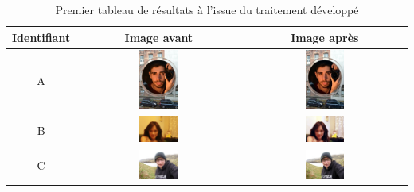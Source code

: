 \documentclass[11pt, french,screen]{report-rd-info}
\begin{document}
\begin{table}
\centering
\begin{tabular}{|c|c|c|}	
   \hline \textbf{Identifiant}  &  \textbf{Image avant}  &  \textbf{Image après}  \\ \hline 
   A & \includegraphics[width=0.25\textwidth]{Resultats/pa_avant} & \includegraphics[width=0.25\textwidth]{Resultats/pa_apres} \\ \hline
   B & \includegraphics[width=0.25\textwidth]{Resultats/pb_avant} & \includegraphics[width=0.25\textwidth]{Resultats/pb_apres} \\ \hline
   C & \includegraphics[width=0.25\textwidth]{Resultats/pc_avant} & \includegraphics[width=0.25\textwidth]{Resultats/pc_apres} \\ \hline   
\end{tabular}
\caption{Premier tableau de résultats à l'issue du traitement développé}
\label{tab:Resultats1}
\end{table}
\end{document}
